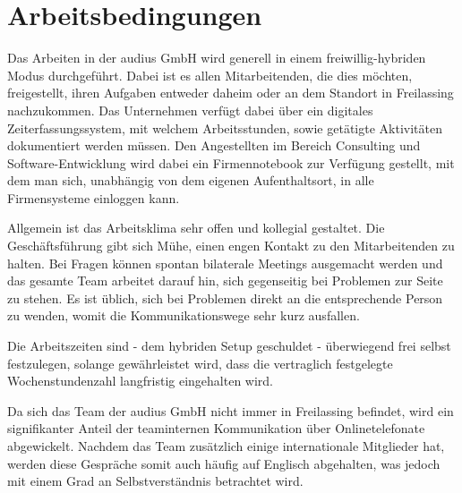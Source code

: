 
\section{Arbeitsbedingungen}
\label{sec:arbeitsbedingungen}

Das Arbeiten in der audius GmbH wird generell in einem freiwillig-hybriden Modus durchgeführt. Dabei ist es allen Mitarbeitenden, die dies möchten, freigestellt, ihren Aufgaben entweder daheim oder an dem Standort in Freilassing nachzukommen. Das Unternehmen verfügt dabei über ein digitales Zeiterfassungssystem, mit welchem Arbeitsstunden, sowie getätigte Aktivitäten dokumentiert werden müssen. Den Angestellten im Bereich Consulting und Software-Entwicklung wird dabei ein Firmennotebook zur Verfügung gestellt, mit dem man sich, unabhängig von dem eigenen Aufenthaltsort, in alle Firmensysteme einloggen kann.

Allgemein ist das Arbeitsklima sehr offen und kollegial gestaltet. Die Geschäftsführung gibt sich Mühe, einen engen Kontakt zu den Mitarbeitenden zu halten. Bei Fragen können spontan bilaterale Meetings ausgemacht werden und das gesamte Team arbeitet darauf hin, sich gegenseitig bei Problemen zur Seite zu stehen. Es ist üblich, sich bei Problemen direkt an die entsprechende Person zu wenden, womit die Kommunikationswege sehr kurz ausfallen.

Die Arbeitszeiten sind - dem hybriden Setup geschuldet - überwiegend frei selbst festzulegen, solange gewährleistet wird, dass die vertraglich festgelegte Wochenstundenzahl langfristig eingehalten wird. 

Da sich das Team der audius GmbH nicht immer in Freilassing befindet, wird ein signifikanter Anteil der teaminternen Kommunikation über Onlinetelefonate abgewickelt. Nachdem das Team zusätzlich einige internationale Mitglieder hat, werden diese Gespräche somit auch häufig auf Englisch abgehalten, was jedoch mit einem Grad an Selbstverständnis betrachtet wird.
